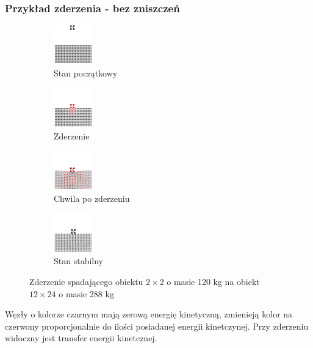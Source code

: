 \documentclass{beamer}
\begin{document}
\begin{frame}
    \frametitle{Przykład zderzenia - bez zniszczeń}
    \begin{figure}[h]

        \begin{subfigure}{0.4\textwidth}
            \centering
            \includegraphics[width=1.7cm, height=1.7cm]{collision_2x2_24x12_mass30_1}
            \caption{Stan początkowy}
        \end{subfigure}
        \begin{subfigure}{0.4\textwidth}
            \centering
            \includegraphics[width=1.7cm, height=1.7cm]{collision_2x2_24x12_mass30_2}
            \caption{Zderzenie}
        \end{subfigure}
        \begin{subfigure}{0.4\textwidth}
            \centering
            \includegraphics[width=1.7cm, height=1.7cm]{collision_2x2_24x12_mass30_3}
            \caption{Chwila po zderzeniu}
        \end{subfigure}
        \begin{subfigure}{0.4\textwidth}
            \centering
            \includegraphics[width=1.7cm, height=1.7cm]{collision_2x2_24x12_mass30_4}
            \caption{Stan stabilny}
        \end{subfigure}

        \caption{Zderzenie spadającego obiektu $2 \times 2$ o masie 120 kg na obiekt $12 \times 24$ o masie 288 kg}
    \end{figure}

    Węzły o kolorze czarnym mają zerową energię kinetyczną, zmienieją kolor na czerwony proporcjonalnie do ilości posiadanej energii kinetczynej.
    Przy zderzeniu widoczny jest transfer energii kinetcznej.
\end{frame}
\end{document}
